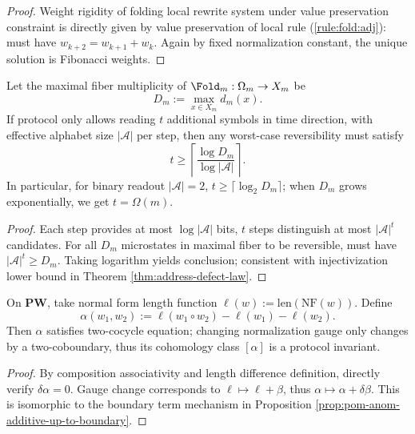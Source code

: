 \begin{proof}
Weight rigidity of folding local rewrite system under value preservation constraint is directly given by value preservation of local rule
\textup{(\ref{rule:fold:adj})}: must have \(w_{k+2}=w_{k+1}+w_k\).
Again by fixed normalization constant, the unique solution is Fibonacci weights.
\end{proof}

\begin{theorem}\label{thm:xi-time-lower-bound-from-max-fiber}
Let the maximal fiber multiplicity of \(\Fold_m:\Omega_m\to X_m\) be
\[
D_m:=\max_{x\in X_m}d_m(x).
\]
If protocol only allows reading \(t\) additional symbols in time direction, with effective alphabet size \(|\mathcal A|\) per step, then any worst-case reversibility must satisfy
\[
t\ge
\left\lceil
\frac{\log D_m}{\log |\mathcal A|}
\right\rceil.
\]
In particular, for binary readout \(|\mathcal A|=2\),
\(
t\ge \lceil \log_2 D_m\rceil
\);
when \(D_m\) grows exponentially, we get \(t=\Omega(m)\).
\end{theorem}

\begin{proof}
Each step provides at most \(\log|\mathcal A|\) bits, \(t\) steps distinguish at most \(|\mathcal A|^t\) candidates.
For all \(D_m\) microstates in maximal fiber to be reversible, must have \(|\mathcal A|^t\ge D_m\).
Taking logarithm yields conclusion; consistent with injectivization lower bound in Theorem \ref{thm:address-defect-law}.
\end{proof}

\begin{proposition}\label{prop:xi-time-length-cocycle}
On \(\mathbf{PW}\), take normal form length function
\(
\ell(w):=\mathrm{len}(\mathrm{NF}(w))
\).
Define
\[
\alpha(w_1,w_2):=\ell(w_1\circ w_2)-\ell(w_1)-\ell(w_2).
\]
Then \(\alpha\) satisfies two-cocycle equation; changing normalization gauge only changes by a two-coboundary,
thus its cohomology class \([\alpha]\) is a protocol invariant.
\end{proposition}

\begin{proof}
By composition associativity and length difference definition, directly verify
\(
\delta\alpha=0
\).
Gauge change corresponds to \(\ell\mapsto \ell+\beta\), thus
\(
\alpha\mapsto \alpha+\delta\beta
\).
This is isomorphic to the boundary term mechanism in Proposition \ref{prop:pom-anom-additive-up-to-boundary}.
\end{proof}

